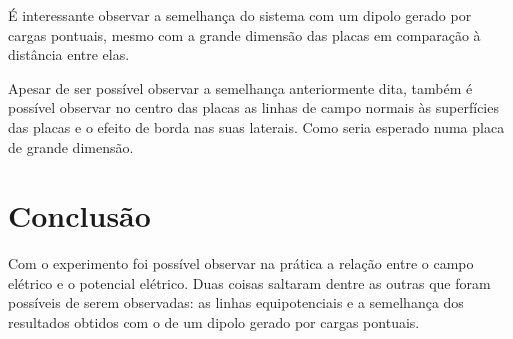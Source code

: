 \documentclass[
12pt,				%
oneside,			%
a4paper,			%
english,			%
french,				%
spanish,			%
brazil				%
]{abntex2}
\begin{document}
É interessante observar a semelhança do sistema com um dipolo gerado por cargas pontuais, mesmo com a grande dimensão das placas em comparação à distância entre elas.

Apesar de ser possível observar a semelhança anteriormente dita, também é possível observar no centro das placas as linhas de campo normais às superfícies das placas e o efeito de borda nas suas laterais. Como seria esperado numa placa de grande dimensão.

\chapter{Conclusão}

Com o experimento foi possível observar na prática a relação entre o campo elétrico e o potencial elétrico.
Duas coisas saltaram dentre as outras que foram possíveis de serem observadas: as linhas equipotenciais e a semelhança dos resultados obtidos com o de um dipolo gerado por cargas pontuais.
\iffalse
	
\begin{figure}[H]
	\begin{center}
		\texttt{[image: \{fluxograma]}.pdf}
		\caption{Fluxograma de aquisição de dados}
		\label{fluxograma}
	\end{center}
\end{figure}
\fi




\postextual


%
%
\end{document}
